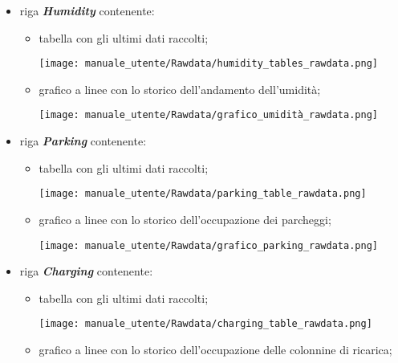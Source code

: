\begin{itemize}
    \item riga \textit{\textbf{Humidity}} contenente:
    \begin{itemize}
        \item tabella con gli ultimi dati raccolti;
        \begin{center}
            \texttt{[image: manuale\_utente/Rawdata/humidity\_tables\_rawdata.png]}
        \end{center}
        \item grafico a linee con lo storico dell'andamento dell'umidità;
        \begin{center}
            \texttt{[image: manuale\_utente/Rawdata/grafico\_umidità\_rawdata.png]}
        \end{center}
    \end{itemize}
    \item riga \textit{\textbf{Parking}} contenente:
    \begin{itemize}
        \item tabella con gli ultimi dati raccolti;
        \begin{center}
            \texttt{[image: manuale\_utente/Rawdata/parking\_table\_rawdata.png]}
        \end{center}
        \item grafico a linee con lo storico dell'occupazione dei parcheggi;
        \begin{center}
            \texttt{[image: manuale\_utente/Rawdata/grafico\_parking\_rawdata.png]}
        \end{center}
    \end{itemize}
    \item riga \textit{\textbf{Charging}} contenente:
    \begin{itemize}
        \item tabella con gli ultimi dati raccolti;
        \begin{center}
            \texttt{[image: manuale\_utente/Rawdata/charging\_table\_rawdata.png]}
        \end{center}
        \item grafico a linee con lo storico dell'occupazione delle colonnine di ricarica;

\end{itemize}
\end{itemize}
